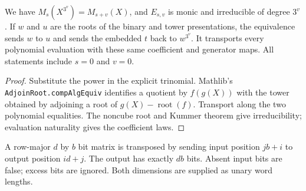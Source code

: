 \begin{theorem}
  \label{thm:lowerbounds-algebraic-binary-extension}
  \leanok
  We have $M_s(X^{3^v})=M_{s+v}(X)$, and $E_{s,v}$ is monic
  and irreducible of degree $3^v$. If $w$ and $u$ are the roots
  of the binary and tower presentations, the equivalence sends
  $w$ to $u$ and sends the embedded $t$ back to $w^{3^v}$.
  It transports every polynomial evaluation with these same
  coefficient and generator maps. All statements include $s=0$
  and $v=0$.
\end{theorem}
\begin{proof}
  \leanok
  Substitute the power in the explicit trinomial. Mathlib's
  \texttt{AdjoinRoot.compAlgEquiv} identifies a quotient by
  $f(g(X))$ with the tower obtained by adjoining a root of
  $g(X)-\operatorname{root}(f)$. Transport along the two polynomial
  equalities. The noncube root and Kummer theorem give irreducibility;
  evaluation naturality gives the coefficient laws.
\end{proof}

\begin{definition}
  \label{def:lowerbounds-algebraic-bit-transpose}
  \leanok
  A row-major $d$ by $b$ bit matrix is transposed by sending
  input position $jb+i$ to output position $id+j$. The output
  has exactly $db$ bits. Absent input bits are false; excess bits
  are ignored. Both dimensions are supplied as unary word lengths.
\end{definition}

